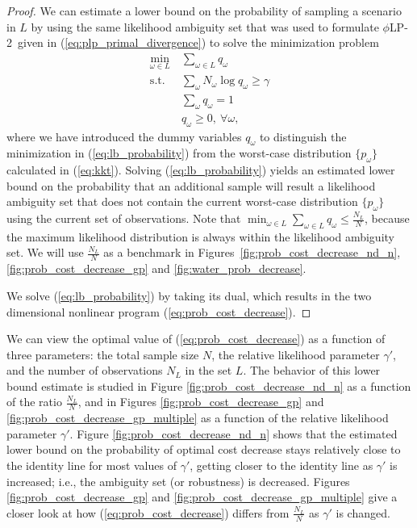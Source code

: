 \documentclass[11pt]{article}
\newcommand{\plp}{$\phi$LP-2}
\begin{document}
\begin{proof}
	We can estimate a lower bound on the probability of sampling a scenario in $L$ by using the same likelihood ambiguity set that was used to formulate \plp\ given in (\ref{eq:plp_primal_divergence}) to solve the minimization problem
	\begin{align}
		\min_{\omega \in L} \ & \sum_{\omega \in L} q_\omega \nonumber \\
		\mbox{s.t.} & \sum_\omega N_\omega \log q_\omega \geq \gamma \label{eq:lb_probability} \\
		& \sum_\omega q_\omega = 1 \nonumber \\
		& q_\omega \geq 0, \ \forall \omega, \nonumber
	\end{align}
	where we have introduced the dummy variables $q_\omega$ to distinguish the minimization in (\ref{eq:lb_probability}) from the worst-case distribution $\{p_\omega\}$ calculated in (\ref{eq:kkt}). 
	Solving (\ref{eq:lb_probability}) yields an estimated lower bound on the probability that an additional sample will result a likelihood ambiguity set that does not contain the current worst-case distribution $\{p_\omega\}$ using the current set of observations.
	Note that $\min_{\omega \in L} \sum_{\omega \in L} q_\omega \leq \frac{N_L}{N}$, because the maximum likelihood distribution is always within the likelihood ambiguity set. We will use $\frac{N_L}{N}$ as a benchmark in Figures~\ref{fig:prob_cost_decrease_nd_n}, \ref{fig:prob_cost_decrease_gp} and \ref{fig:water_prob_decrease}. 

	We solve (\ref{eq:lb_probability}) by taking its dual, which results in the two dimensional nonlinear program (\ref{eq:prob_cost_decrease}).
\end{proof}

We can view the optimal value of (\ref{eq:prob_cost_decrease}) as a function of three parameters: the total sample size $N$, the relative likelihood parameter $\gamma'$, and the number of observations $N_L$ in the set $L$.
The behavior of this lower bound estimate is studied in Figure \ref{fig:prob_cost_decrease_nd_n} as a function of the ratio $\tfrac{N_L}{N}$, and in Figures \ref{fig:prob_cost_decrease_gp} and \ref{fig:prob_cost_decrease_gp_multiple} as a function of the relative likelihood parameter $\gamma'$.
Figure \ref{fig:prob_cost_decrease_nd_n} shows that the estimated lower bound on the probability of optimal cost decrease stays relatively close to the identity line for most values of $\gamma'$, getting closer to the identity line as  $\gamma'$ is increased; i.e., the ambiguity set (or robustness) is decreased.
Figures \ref{fig:prob_cost_decrease_gp} and \ref{fig:prob_cost_decrease_gp_multiple} give a closer look at how (\ref{eq:prob_cost_decrease}) differs from $\tfrac{N_L}{N}$ as $\gamma'$ is changed.
\end{document}
